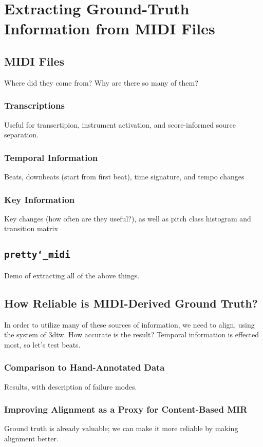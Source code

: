 \chapter{Extracting Ground-Truth Information from MIDI Files}
\label{ch:extracting}

\section{MIDI Files}

Where did they come from?
Why are there so many of them?

\subsection{Transcriptions}

Useful for transcrtipion, instrument activation, and score-informed source separation.

\subsection{Temporal Information}

Beats, downbeats (start from first beat), time signature, and tempo changes

\subsection{Key Information}

Key changes (how often are they useful?), as well as pitch class histogram and transition matrix

\section{\texttt{pretty\char`_midi}}

Demo of extracting all of the above things.

\section{How Reliable is MIDI-Derived Ground Truth?}

In order to utilize many of these sources of information, we need to align, using the system of 3dtw.
How accurate is the result?
Temporal information is effected most, so let's test beats.

\subsection{Comparison to Hand-Annotated Data}

Results, with description of failure modes.

\subsection{Improving Alignment as a Proxy for Content-Based MIR}

Ground truth is already valuable; we can make it more reliable by making alignment better.
